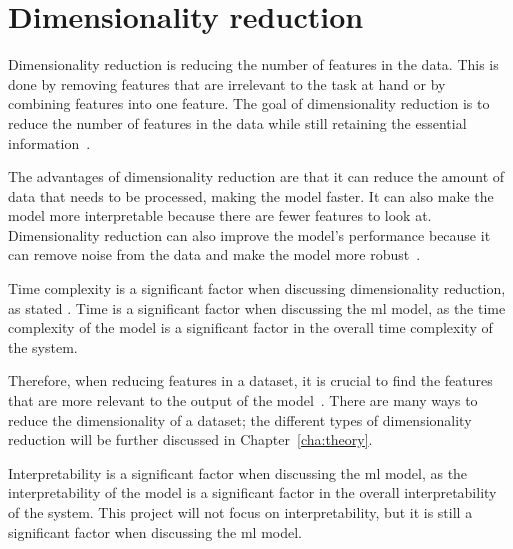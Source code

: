 

\section{Dimensionality reduction}\label{sec:dimensionality-reduction-problem}

Dimensionality reduction is reducing the number of features in the data. This is done by removing features that are irrelevant to the task at hand or by combining features into one feature. The goal of dimensionality reduction is to reduce the number of features in the data while still retaining the essential information~\cite{dimensionality-reduction-cheng}. 

The advantages of dimensionality reduction are that it can reduce the amount of data that needs to be processed, making the model faster. It can also make the model more interpretable because there are fewer features to look at. Dimensionality reduction can also improve the model's performance because it can remove noise from the data and make the model more robust~\cite{dimensionality-reduction-cheng}.

Time complexity is a significant factor when discussing dimensionality reduction, as stated . Time is a significant factor when discussing the \gls{ml} model, as the time complexity of the model is a significant factor in the overall time complexity of the system. 

Therefore, when reducing features in a dataset, it is crucial to find the features that are more relevant to the output of the model~\cite{Feature-engineering-zheng}. There are many ways to reduce the dimensionality of a dataset; the different types of dimensionality reduction will be further discussed in Chapter~\ref{cha:theory}.

Interpretability is a significant factor when discussing the \gls{ml} model, as the interpretability of the model is a significant factor in the overall interpretability of the system. This project will not focus on interpretability, but it is still a significant factor when discussing the \gls{ml} model.
